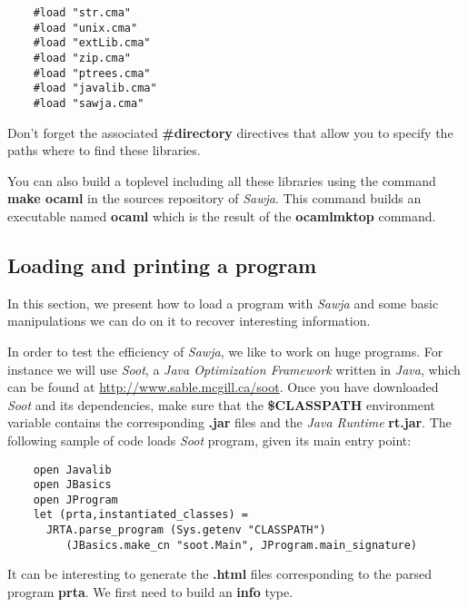 \documentclass{article}
\begin{document}
\begin{verbatim}
    #load "str.cma"
    #load "unix.cma"
    #load "extLib.cma"
    #load "zip.cma"
    #load "ptrees.cma"
    #load "javalib.cma"
    #load "sawja.cma"
\end{verbatim}
Don't forget the associated \textbf{\#directory} directives that
allow you to specify the paths where to find these libraries.

You can also build a toplevel including all these libraries using
the command \textbf{make ocaml} in the sources repository of
\emph{Sawja}. This command builds an executable named
\textbf{ocaml} which is the result of the \textbf{ocamlmktop}
command.

\subsection{Loading and printing a program}

In this section, we present how to load a program with \emph{Sawja}
and some basic manipulations we can do on it to recover interesting
information.

In order to test the efficiency of \emph{Sawja}, we like to work on
huge programs. For instance we will use \emph{Soot}, a
\emph{Java Optimization Framework} written in \emph{Java}, which
can be found at
\href{http://www.sable.mcgill.ca/soot}{http://www.sable.mcgill.ca/soot}.
Once you have downloaded \emph{Soot} and its dependencies, make
sure that the \textbf{\$CLASSPATH} environment variable contains
the corresponding \textbf{.jar} files and the \emph{Java Runtime}
\textbf{rt.jar}. The following sample of code loads \emph{Soot}
program, given its main entry point:

\begin{verbatim}
    open Javalib
    open JBasics
    open JProgram
    let (prta,instantiated_classes) =
      JRTA.parse_program (Sys.getenv "CLASSPATH")
         (JBasics.make_cn "soot.Main", JProgram.main_signature)
\end{verbatim}
It can be interesting to generate the \textbf{.html} files
corresponding to the parsed program \textbf{prta}. We first need to
build an \textbf{info} type.
\end{document}

